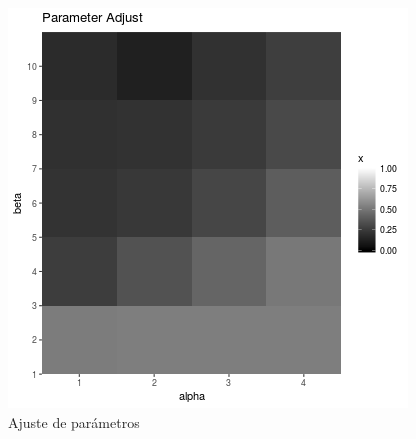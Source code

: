 \documentclass[10pt, a4paper, twocolumn]{article} %
\begin{document}
\begin{figure}
	\includegraphics[width=\linewidth]{param_adjust.png} %
	\caption{Ajuste de parámetros} %
	\label{fig:ajuste1} %
\end{figure}

\end{document}
